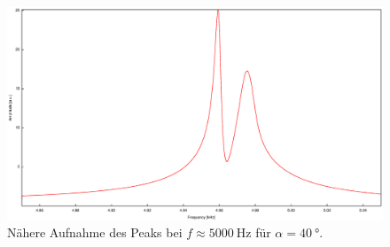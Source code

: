 \begin{figure}
\centering
\includegraphics[width=\linewidth-60pt,height=\textheight-60pt,keepaspectratio]{FP-V23data/2.2_40degree.eps}
\caption{Nähere Aufnahme des Peaks bei $f\approx\SI{5000}{\hertz}$ für $\alpha=\SI{40}{\degree}$.}
\label{fig:5k_Peak2}
\end{figure}

